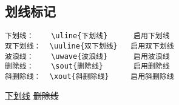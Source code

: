 \subsection{划线标记}
\begin{verbatim}
下划线：    \uline{下划线}      启用下划线
双下划线：  \uuline{双下划线}   启用双下划线
波浪线：    \uwave{波浪线}      启用波浪线
删除线：    \sout{删除线}       启用删除线
斜删除线：  \xout{斜删除线}     启用斜删除线
\end{verbatim}
{\uline{下划线}} {} {} {\sout{删除线}} {}

\clearpage
